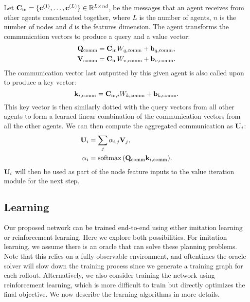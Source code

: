 Let  $\mathbf{C}_{\mathrm{in}} = \{\mathbf{c}^{(1)}, \dots, \mathbf{c}^{(L)}\} \in \mathbb{R}^{L \times nd}$,  be the messages that an agent receives  from other agents concatenated together,  where $L$ is the number of agents,
$n$ is the number of nodes and $d$ is the features dimension. The agent transforms the communication vectors
to produce a query and a value vector:
\begin{align}
  \mathbf{Q}_{\mathrm{comm}} &= \mathbf{C}_{\mathrm{in}} W_{q,{\mathrm{comm}}} + \mathbf{b}_{q,\mathrm{comm}}, \\
  \mathbf{V}_{\mathrm{comm}} &= \mathbf{C}_{\mathrm{in}} W_{v,{\mathrm{comm}}} + \mathbf{b}_{v,\mathrm{comm}}.
\end{align}
The communication vector last outputted by this given agent is also called upon to produce a key
vector:
\begin{equation}
  \mathbf{k}_{i,{\mathrm{comm}}} = \mathbf{C}_{\mathrm{in}, i} W_{k,\mathrm{comm}} + \mathbf{b}_{k,\mathrm{comm}}.
\end{equation}
This key vector is then similarly dotted with the query vectors from all other agents to form a
learned linear combination of the communication vectors from all the other agents.
 We can then compute the aggregated communication as
$\mathbf{U}_{i}$:
\begin{align}
\mathbf{U}_{i} &= \sum_j \alpha_{i,j} \mathbf{V}_j,  \\
\mathbf{\alpha}_i   &= \mathop{\mathrm{softmax}}{(\mathbf{Q_{\mathrm{comm}}} \mathbf{k}_{i,{\mathrm{comm}}})}.
\end{align}
$\mathbf{U}_{i}$ will then be used as part of the node feature inputs to the value iteration module for the
next step.

\subsection{Learning}
Our proposed network can be trained end-to-end using either imitation learning or reinforcement
learning. Here we explore both possibilities. For imitation learning, we assume there is an
oracle that can solve these planning problems. Note that this relies on a fully observable
environment, and oftentimes the oracle solver will slow down the training process since we generate
a training graph for each rollout.
Alternatively, we also consider training the network using
reinforcement learning, which is more difficult to train but directly optimizes the final objective.
We now describe the learning algorithms in more details.

